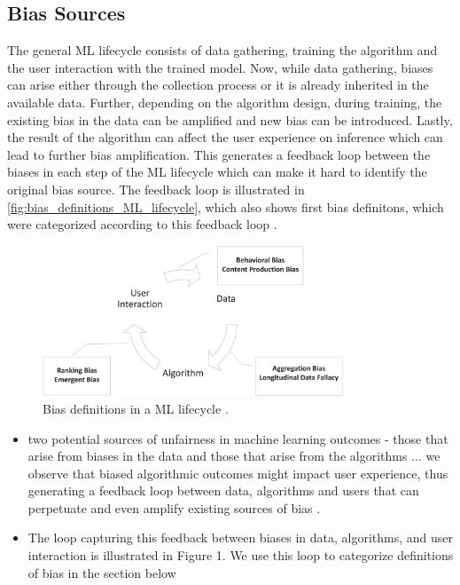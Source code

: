 \begin{refsection}
		
			\subsection{Bias Sources}
		The general \gls{ML} lifecycle consists of data gathering, training the algorithm and the user interaction with the trained model. Now, while data gathering, biases can arise either through the collection process or it is already inherited in the available data. Further, depending on the algorithm design, during training, the existing bias in the data can be amplified and new bias can be introduced. Lastly, the result of the algorithm can affect the user experience on inference which can lead to further bias amplification. This generates a feedback loop between the biases in each step of the \gls{ML} lifecycle which can make it hard to identify the original bias source. The feedback loop is illustrated in \autoref{fig:bias_definitions_ML_lifecycle}, which also shows first bias definitons, which were categorized according to this feedback loop \autocite{Mehrabi_2021}.
		
		\begin{figure}[H]
			\centering
			\includegraphics[width=0.8\textwidth]{figures/BiasCategoriesInMLLifecycle.png}
			\caption{Bias definitions in a \gls{ML} lifecycle \autocite{Mehrabi_2021}.}
			\label{fig:bias_definitions_ML_lifecycle}
		\end{figure}
		
		\rawcitationusedstart
		\begin{itemize}
			\item two potential sources of unfairness in machine learning outcomes - those that arise from biases in the data and those that arise from the algorithms ... we observe that biased algorithmic outcomes might impact user experience, thus generating a feedback loop between data, algorithms and users that can perpetuate and even amplify existing sources of bias \autocite{Mehrabi_2021}.
			\item The loop capturing this feedback between biases in data, algorithms, and user interaction is illustrated in Figure 1. We use this loop to categorize definitions of bias in the section below \autocite{Mehrabi_2021}
		\end{itemize}
		\rawcitationusedend
		

\end{refsection}
